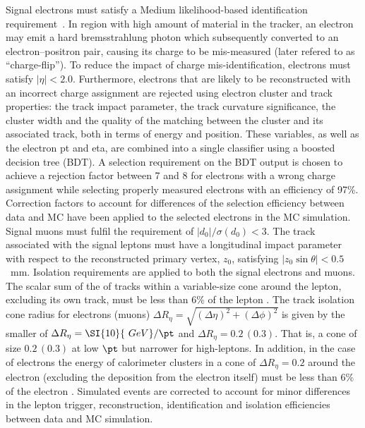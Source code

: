 Signal electrons must satisfy a Medium likelihood-based identification requirement~\cite{ATLAS-CONF-2016-024}.
In region with high amount of material in the tracker, an electron may emit a hard brems\-strah\-lung photon which subsequently 
converted to an electron--positron pair, causing its charge to be mis-measured (later refered to as ``charge-flip''). 
To reduce the impact of charge mis-identification, electrons must satisfy $|\eta|<2.0$. Furthermore, electrons that 
are likely to be reconstructed with an incorrect charge assignment are rejected using electron
cluster and track properties: the track impact parameter, the track curvature significance, the cluster width and the
quality of the matching between the cluster and its associated track, both in terms of energy and position. These
variables, as well as the electron pt and eta, are combined into a single classifier using a boosted decision tree (BDT). 
A selection requirement on the BDT output is chosen to achieve a rejection factor between 7 and 8 for electrons 
with a wrong charge assignment while selecting properly measured electrons with an efficiency of 97\%. Correction
factors to account for differences of the selection efficiency between data and MC have been applied to the selected 
electrons in the MC simulation.
Signal muons must fulfil the requirement of $\vert d_0\vert/\sigma(d_0) < 3$. 
The track associated with the signal leptons must have a longitudinal impact parameter with respect to the 
reconstructed primary vertex, $z_0$, satisfying $\vert z_0 \sin\theta\vert  < 0.5$~mm. 
Isolation requirements are applied to both the signal electrons and muons. 
The  scalar sum of the \pt of tracks within a variable-size cone around the lepton, 
excluding its own track, must be less than 6\% of the lepton \pt. 
The track isolation cone radius for electrons (muons) 
$\Delta R_\eta=\sqrt{(\Delta\eta)^2+(\Delta\phi)^2}$ 
is given by the smaller of $\Delta R_\eta = \SI{10}{~GeV}/\pt$ and $\Delta R_\eta = 0.2\,(0.3)$. 
That is, a cone of size $0.2\,(0.3)$ at low $\pt$ but narrower for high-\pt leptons. 
In addition, in the case of electrons the energy of calorimeter clusters in a cone of $\Delta R_\eta = 0.2$ around the electron 
(excluding the deposition from the electron itself) must be less than 6\% of the electron \pt. 
Simulated events are corrected to account for minor differences in the lepton trigger, reconstruction, 
identification and isolation efficiencies between data and MC simulation.

